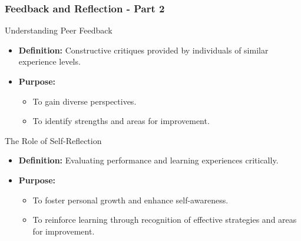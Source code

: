 \documentclass{beamer}
\begin{document}
\begin{frame}[fragile]
    \frametitle{Feedback and Reflection - Part 2}
    \begin{block}{Understanding Peer Feedback}
        \begin{itemize}
            \item \textbf{Definition:} Constructive critiques provided by individuals of similar experience levels.
            \item \textbf{Purpose:}
                \begin{itemize}
                    \item To gain diverse perspectives.
                    \item To identify strengths and areas for improvement.
                \end{itemize}
        \end{itemize}
    \end{block}
    
    \begin{block}{The Role of Self-Reflection}
        \begin{itemize}
            \item \textbf{Definition:} Evaluating performance and learning experiences critically.
            \item \textbf{Purpose:}
                \begin{itemize}
                    \item To foster personal growth and enhance self-awareness.
                    \item To reinforce learning through recognition of effective strategies and areas for improvement.
                \end{itemize}
        \end{itemize}
    \end{block}
\end{frame}
\end{document}
